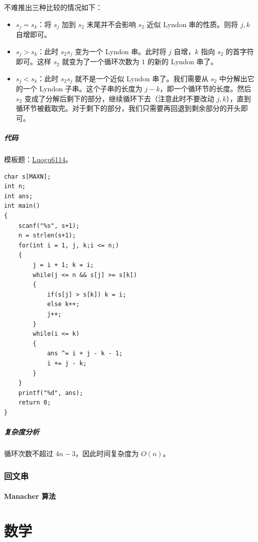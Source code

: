 \documentclass[10pt,twoside,a4paper,UTF8]{ctexbook}
\begin{document}
	不难推出三种比较的情况如下：
	\begin{itemize}
		\item $s_j = s_k$：将 $s_j$ 加到 $s_2$ 末尾并不会影响 $s_2$ 近似 Lyndon 串的性质。则将 $j, k$ 自增即可。
		\item $s_j > s_k$：此时 $s_2s_j$ 变为一个 Lyndon 串。此时将 $j$ 自增，$k$ 指向 $s_2$ 的首字符即可。这样 $s_2$ 就变为了一个循环次数为 $1$ 的新的 Lyndon 串了。
		\item $s_j < s_k$：此时 $s_2s_j$ 就不是一个近似 Lyndon 串了。我们需要从 $s_2$ 中分解出它的一个 Lyndon 子串。这个子串的长度为 $j-k$，即一个循环节的长度。然后 $s_2$ 变成了分解后剩下的部分，继续循环下去（注意此时不要改动 $j, k$），直到循环节被截取完。对于剩下的部分，我们只需要再回退到剩余部分的开头即可。
	\end{itemize}
	
	\subsubsection{代码}
	模板题：\href{https://www.luogu.com.cn/problem/P6114}{Luogu6114}。
	\begin{lstlisting}
char s[MAXN];
int n;
int ans;
int main()
{
	scanf("%s", s+1);
	n = strlen(s+1);
	for(int i = 1, j, k;i <= n;)
	{
		j = i + 1; k = i;
		while(j <= n && s[j] >= s[k])
		{
			if(s[j] > s[k]) k = i;
			else k++;
			j++;
		}
		while(i <= k)
		{
			ans ^= i + j - k - 1;
			i += j - k;
		}
	}
	printf("%d", ans);
	return 0;
}
	\end{lstlisting}
	
	\subsubsection{复杂度分析}
	
	循环次数不超过 $4n-3$，因此时间复杂度为 $O(n)$。
	
	\section{回文串}
	\subsection{Manacher 算法}
	
	
	\part{数学}
\end{document}
